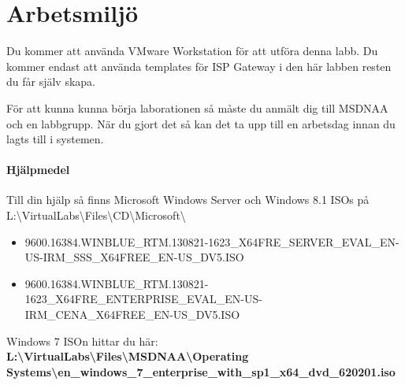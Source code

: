 \documentclass[paper=a4, fontsize=11pt]{report} %
\newcommand{\win}[1]{Microsoft Windows Server\ifthenelse{\isempty{#1}}{}{ #1}}
\begin{document}
\section{Arbetsmiljö}
\label{enviroment}
Du kommer att använda VMware Workstation för att utföra denna labb. Du kommer endast att använda templates för ISP Gateway i den här labben resten du får själv skapa.

För att kunna kunna börja laborationen så måste du anmält dig till MSDNAA och en labbgrupp. När du gjort det så kan det ta upp till en arbetsdag innan du lagts till i systemen. 
\paragraph{Hjälpmedel} Till din hjälp så finns \win{2012 R2} och Windows 8.1 ISOs på 
L:\textbackslash VirtualLabs\textbackslash Files\textbackslash CD\textbackslash Microsoft\textbackslash 
\begin{itemize}
\item 9600.16384.WINBLUE\_RTM.130821-1623\_X64FRE\_SERVER\_EVAL\_EN-US-IRM\_SSS\_X64FREE\_EN-US\_DV5.ISO
\item 9600.16384.WINBLUE\_RTM.130821-1623\_X64FRE\_ENTERPRISE\_EVAL\_EN-US-IRM\_CENA\_X64FREE\_EN-US\_DV5.ISO
\end{itemize}
Windows 7 ISOn hittar du här: \textbf{L:\textbackslash VirtualLabs\textbackslash Files\textbackslash MSDNAA\textbackslash Operating Systems\textbackslash en\_windows\_7\_enterprise\_with\_sp1\_x64\_dvd\_620201.iso
}
\end{document}
